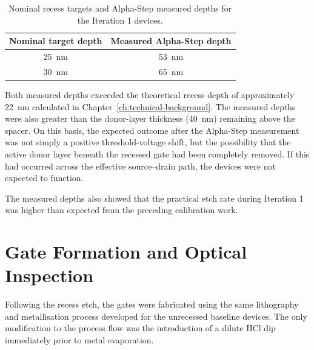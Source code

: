 \vspace{2mm}

\begin{table}[htbp]
    \centering
    \caption{Nominal recess targets and Alpha-Step measured depths for the
    Iteration 1 devices.}
    \label{tab:iteration_1_recess_depths}
    \small
    \begin{tabular}{c c}
        \toprule
        Nominal target depth & Measured Alpha-Step depth \\
        \midrule
        \SI{25}{\nano\metre} & \SI{53}{\nano\metre} \\
        \SI{30}{\nano\metre} & \SI{65}{\nano\metre} \\
        \bottomrule
    \end{tabular}
\end{table}

\vspace{2mm}

Both measured depths exceeded the theoretical recess depth of approximately
\SI{22}{\nano\metre} calculated in Chapter~\ref{ch:technical-background}.
The measured depths were also greater than the donor-layer thickness (\SI{40}{\nano\metre})
remaining above the spacer. On this basis, the
expected outcome after the Alpha-Step measurement was not simply a positive
threshold-voltage shift, but the possibility that the active donor layer
beneath the recessed gate had been completely removed. If this had occurred
across the effective source--drain path, the devices were not expected to
function.

\vspace{4mm}


\vspace{1mm}

The measured depths also showed that the practical etch rate during Iteration 1
was higher than expected from the preceding calibration work.

\section{Gate Formation and Optical Inspection}
Following the recess etch, the gates were fabricated using the same
lithography and metallisation process developed for the unrecessed baseline
devices. The only modification to the process flow was the introduction of a
dilute HCl dip immediately prior to metal evaporation.

\vspace{1mm}

